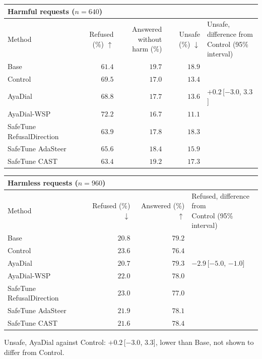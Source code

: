 \documentclass[10pt,a4paper]{article}
\renewcommand{\arraystretch}{1.12}
\begin{document}
\begin{table}[H]\centering\small\renewcommand{\arraystretch}{1.25}\begin{tabular}{|l|r|r|r|l|}\hline
\multicolumn{5}{|l|}{\textbf{Harmful requests ($n = 640$)}}\\\hline
Method & Refused (\%) $\uparrow$ & \makecell[r]{Answered without\\harm (\%)} & Unsafe (\%) $\downarrow$ & \makecell[l]{Unsafe, difference from\\Control (95\% interval)}\\\hline
Base & $61.4$ & $19.7$ & $18.9$ & \\\hline
Control & $69.5$ & $17.0$ & $13.4$ & \\\hline
AyaDial & $68.8$ & $17.7$ & $13.6$ & $+0.2$\,[$-3.0$, $3.3$]\\\hline
AyaDial-WSP & \cellcolor{win}$\mathbf{72.2}$ & $16.7$ & \cellcolor{win}$\mathbf{11.1}$ & \\\hline
SafeTune RefusalDirection & $63.9$ & $17.8$ & $18.3$ & \\\hline
SafeTune AdaSteer & $65.6$ & $18.4$ & $15.9$ & \\\hline
SafeTune CAST & $63.4$ & $19.2$ & $17.3$ & \\\hline
\end{tabular}\end{table}
\begin{table}[H]\centering\small\renewcommand{\arraystretch}{1.25}\begin{tabular}{|l|r|r|l|}\hline
\multicolumn{4}{|l|}{\textbf{Harmless requests ($n = 960$)}}\\\hline
Method & Refused (\%) $\downarrow$ & Answered (\%) $\uparrow$ & \makecell[l]{Refused, difference from\\Control (95\% interval)}\\\hline
Base & $20.8$ & $79.2$ & \\\hline
Control & $23.6$ & $76.4$ & \\\hline
AyaDial & $20.7$ & $79.3$ & $-2.9$\,[$-5.0$, $-1.0$]\\\hline
AyaDial-WSP & $22.0$ & $78.0$ & \\\hline
SafeTune RefusalDirection & $23.0$ & $77.0$ & \\\hline
SafeTune AdaSteer & $21.9$ & $78.1$ & \\\hline
SafeTune CAST & $21.6$ & $78.4$ & \\\hline
\end{tabular}\end{table}
Unsafe, AyaDial against Control: $+0.2$\,[$-3.0$, $3.3$], lower than Base, not shown to differ from Control.
\end{document}
